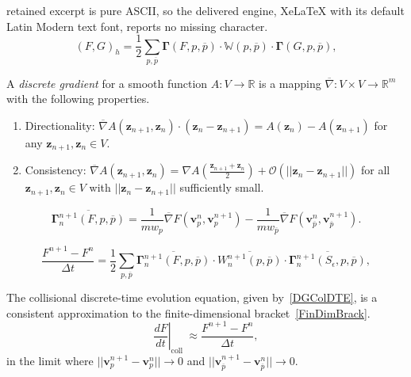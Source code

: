 \documentclass[10pt,a4paper]{amsart}
\begin{document}
retained excerpt is pure ASCII, so the delivered engine, XeLaTeX with its default Latin Modern text font, reports no missing character.
\begin{equation}
(F, G)_{h}=\frac{1}{2} \sum_{p, \overline{p}} \boldsymbol{\Gamma}(F, p, \overline{p}) \cdot \mathbb{W}(p, \overline{p}) \cdot \boldsymbol{\Gamma}(G, p, \overline{p}),
\label{FinDimBrack}
\end{equation} 

\begin{definition}
  A \textit{discrete gradient} for a smooth function $A:V \rightarrow \mathbb{R}$ is a mapping $\overline{\nabla}: V \times V \rightarrow \mathbb{R}^m$ with the following properties.
\begin{enumerate}
  \item Directionality: $\overline{\nabla} A(\boldsymbol{z}_{n+1},\boldsymbol{z}_{n}) \cdot (\boldsymbol{z}_{n}-\boldsymbol{z}_{n+1}) = A(\boldsymbol{z}_{n}) - A(\boldsymbol{z}_{n+1})$ for any $\boldsymbol{z}_{n+1},\boldsymbol{z}_{n} \in V$.
  \item Consistency: $\overline{\nabla} A(\boldsymbol{z}_{n+1},\boldsymbol{z}_{n})=\nabla A(\frac{\boldsymbol{z}_{n+1}+\boldsymbol{z}_{n}}{2}) + \mathcal{O}(||\boldsymbol{z}_{n}-\boldsymbol{z}_{n+1}||)$ for all $\boldsymbol{z}_{n+1},\boldsymbol{z}_{n} \in V$ with $||\boldsymbol{z}_{n}-\boldsymbol{z}_{n+1}||$ sufficiently small.
  \end{enumerate}
  \label{DGDef}
\end{definition}

\begin{equation}
\overline{\boldsymbol{\Gamma}_{n}^{n+1}(F, p, \overline{p})}=\frac{1}{m w_{p}} \overline{\nabla} F (\boldsymbol{v}_{p}^{n},\boldsymbol{v}_{p}^{n+1})-\frac{1}{m w_{\overline{p}}} \overline{\nabla} F (\boldsymbol{v}_{\overline{p}}^{n},\boldsymbol{v}_{\overline{p}}^{n+1}).
\label{GammaBar}
\end{equation}

\begin{equation}
\frac{F^{n+1} - F^{n}}{\Delta t} = \frac{1}{2} \sum_{p,\overline{p}} \overline{\boldsymbol{\Gamma}^{n+1}_{n} (F,p,\overline{p})} \cdot \overline{W^{n+1}_{n} (p,\overline{p})} \cdot \overline{\boldsymbol{\Gamma}^{n+1}_{n} (S_{\epsilon},p,\overline{p})},
\label{DGColDTE}
\end{equation}

\begin{theorem}
The collisional discrete-time evolution equation, given by~\eqref{DGColDTE}, is a consistent approximation to the finite-dimensional bracket~\eqref{FinDimBrack}. \\
\begin{equation}
\left. \frac{d F}{d t}\right|_{\text {coll }} \approx \frac{F^{n+1} - F^{n}}{\Delta t},
\end{equation}
in the limit where $||\boldsymbol{v}_{p}^{n+1} - \boldsymbol{v}_{p}^{n}|| \rightarrow 0$ and $||\boldsymbol{v}_{\overline{p}}^{n+1} - \boldsymbol{v}_{\overline{p}}^{n}|| \rightarrow 0$.
\end{theorem}
\end{document}
